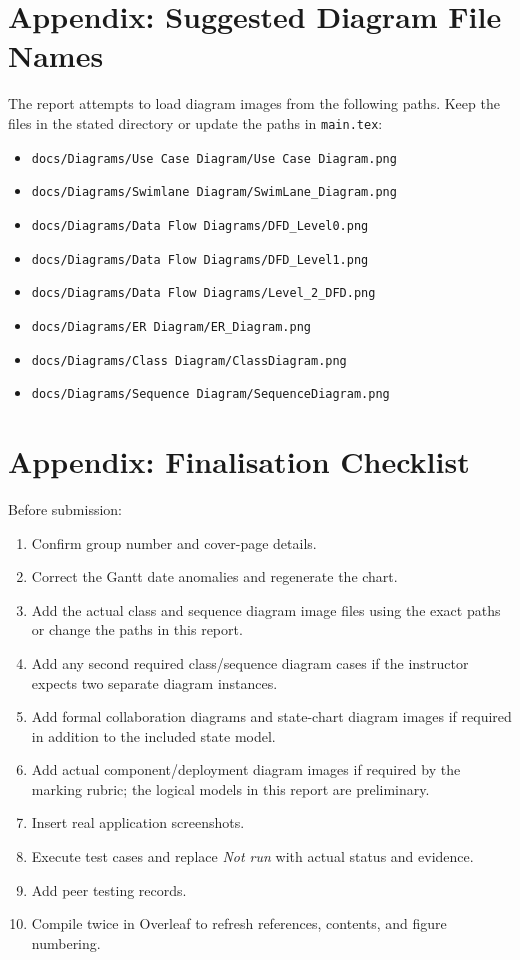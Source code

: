 \documentclass[12pt,a4paper]{report}
\begin{document}
\appendix
\chapter{Appendix: Suggested Diagram File Names}
The report attempts to load diagram images from the following paths. Keep the files in the stated directory or update the paths in \texttt{main.tex}:
\begin{itemize}
\item \texttt{docs/Diagrams/Use Case Diagram/Use Case Diagram.png}
\item \texttt{docs/Diagrams/Swimlane Diagram/SwimLane\_Diagram.png}
\item \texttt{docs/Diagrams/Data Flow Diagrams/DFD\_Level0.png}
\item \texttt{docs/Diagrams/Data Flow Diagrams/DFD\_Level1.png}
\item \texttt{docs/Diagrams/Data Flow Diagrams/Level\_2\_DFD.png}
\item \texttt{docs/Diagrams/ER Diagram/ER\_Diagram.png}
\item \texttt{docs/Diagrams/Class Diagram/ClassDiagram.png}
\item \texttt{docs/Diagrams/Sequence Diagram/SequenceDiagram.png}
\end{itemize}

\chapter{Appendix: Finalisation Checklist}
Before submission:
\begin{enumerate}
\item Confirm group number and cover-page details.
\item Correct the Gantt date anomalies and regenerate the chart.
\item Add the actual class and sequence diagram image files using the exact paths or change the paths in this report.
\item Add any second required class/sequence diagram cases if the instructor expects two separate diagram instances.
\item Add formal collaboration diagrams and state-chart diagram images if required in addition to the included state model.
\item Add actual component/deployment diagram images if required by the marking rubric; the logical models in this report are preliminary.
\item Insert real application screenshots.
\item Execute test cases and replace \textit{Not run} with actual status and evidence.
\item Add peer testing records.
\item Compile twice in Overleaf to refresh references, contents, and figure numbering.
\end{enumerate}
\end{document}
